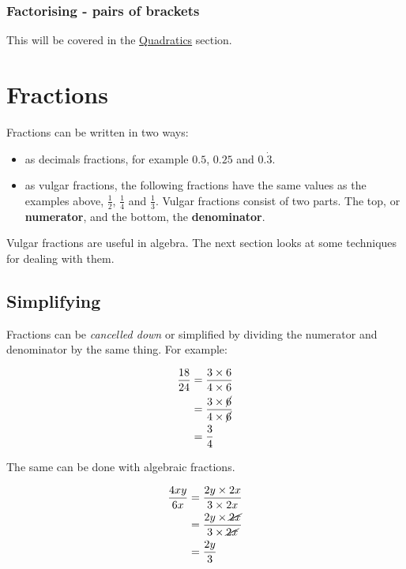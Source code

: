 \documentclass[
  a4paper,
]{scrbook}
\providecommand{\tightlist}{%
  \setlength{\itemsep}{0pt}\setlength{\parskip}{0pt}}\usepackage{longtable,booktabs,array}
\begin{document}
\hypertarget{factorising---pairs-of-brackets}{%
\subsection{Factorising - pairs of
brackets}\label{factorising---pairs-of-brackets}}

This will be covered in the \protect\hyperlink{quadratics-1}{Quadratics}
section.


\hypertarget{fractions}{%
\chapter{Fractions}\label{fractions}}

Fractions can be written in two ways:

\begin{itemize}
\tightlist
\item
  as decimals fractions, for example \(0.5\), \(0.25\) and
  \(0.\dot{3}\).
\item
  as vulgar fractions, the following fractions have the same values as
  the examples above, \(\frac{1}{2}\), \(\frac{1}{4}\) and
  \(\frac{1}{3}\). Vulgar fractions consist of two parts. The top, or
  \textbf{numerator}, and the bottom, the \textbf{denominator}.
\end{itemize}

Vulgar fractions are useful in algebra. The next section looks at some
techniques for dealing with them.

\hypertarget{simplifying}{%
\section{Simplifying}\label{simplifying}}

Fractions can be \emph{cancelled down} or simplified by dividing the
numerator and denominator by the same thing. For example:

\[
\begin{aligned} \frac{18}{24} &= \frac{3 \times 6}{4 \times 6} \\
&= \frac{3 \times \cancel{6}}{4 \times \cancel{6}} \\
&= \frac{3}{4}
\end{aligned}
\]

The same can be done with algebraic fractions.

\[
\begin{aligned} \frac{4xy}{6x} &= \frac{2y \times 2x}{3 \times 2x} \\
&= \frac{2y \times \cancel{2x}}{3 \times \cancel{2x}} \\
&= \frac{2y}{3}
\end{aligned}
\]
\end{document}
